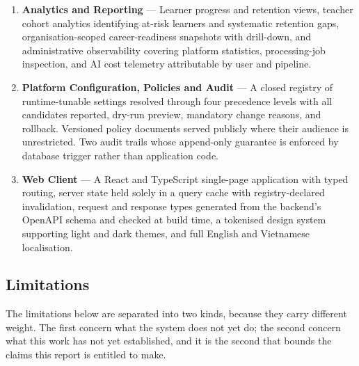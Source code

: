 \begin{enumerate}
    \item \textbf{Analytics and Reporting} --- Learner progress and retention views, teacher cohort analytics identifying at-risk learners and systematic retention gaps, organisation-scoped career-readiness snapshots with drill-down, and administrative observability covering platform statistics, processing-job inspection, and AI cost telemetry attributable by user and pipeline.

    \item \textbf{Platform Configuration, Policies and Audit} --- A closed registry of runtime-tunable settings resolved through four precedence levels with all candidates reported, dry-run preview, mandatory change reasons, and rollback. Versioned policy documents served publicly where their audience is unrestricted. Two audit trails whose append-only guarantee is enforced by database trigger rather than application code.

    \item \textbf{Web Client} --- A React and TypeScript single-page application with typed routing, server state held solely in a query cache with registry-declared invalidation, request and response types generated from the backend's OpenAPI schema and checked at build time, a tokenised design system supporting light and dark themes, and full English and Vietnamese localisation.
\end{enumerate}

\subsection{Limitations}

The limitations below are separated into two kinds, because they carry different weight. The first concern what the system does not yet do; the second concern what this work has not yet established, and it is the second that bounds the claims this report is entitled to make.

